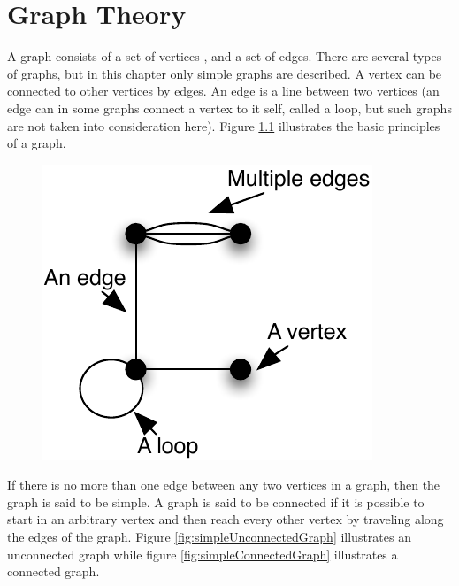 \chapter {Graph Theory}
\label{chap:graphTheory}

A graph consists of a set of vertices \cite[p. 592]{Rosen07}, and a set of edges. There are several types of graphs, but in this chapter only simple graphs are described.  
A vertex can be connected to other vertices by edges.
An edge is a line between two vertices (an edge can in some graphs connect a vertex to it self, called a loop, but such graphs are not taken into consideration here). Figure \ref{fig:generalDescriptionGraph} illustrates the basic principles of a graph.
\begin{figure}[ht]
	\centering
		\includegraphics[scale = 0.7]{input/pics/generalDescriptionGraph.pdf}
	\caption{}
	\label{fig:generalDescriptionGraph}
\end{figure}

If there is no more than one edge between any two vertices in a graph, then the graph is said to be simple.
A graph is said to be connected if it is possible to start in an arbitrary vertex and then reach every other vertex by traveling along the edges of the graph. 
Figure \ref{fig:simpleUnconnectedGraph} illustrates an unconnected graph while figure \ref{fig:simpleConnectedGraph} illustrates a connected graph. 

